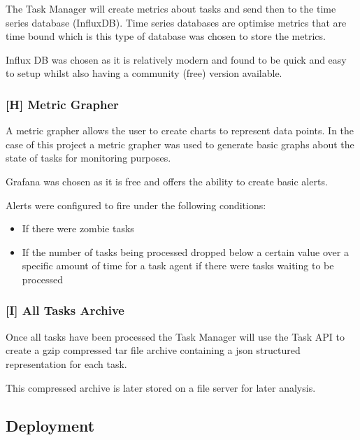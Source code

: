 \documentclass{mscreport}
\begin{document}
The Task Manager will create metrics about tasks and send then to the time series database (InfluxDB). Time series databases are optimise metrics that are time bound which is this type of database was chosen to store the metrics.

\vspace{0.3cm} \noindent
Influx DB was chosen as it is relatively modern and found to be quick and easy to setup whilst also having a community (free) version available.

\subsubsection{[H] Metric Grapher}

A metric grapher allows the user to create charts to represent data points. In the case of this project a metric grapher was used to generate basic graphs about the state of tasks for monitoring purposes.

\vspace{0.3cm} \noindent
Grafana was chosen as it is free and offers the ability to create basic alerts.

\vspace{0.3cm} \noindent
Alerts were configured to fire under the following conditions:

\begin{itemize}
	\setlength\itemsep{0.1em}
    \item If there were zombie tasks
    \item If the number of tasks being processed dropped below a certain value over a specific amount of time for a task agent if there were tasks waiting to be processed
\end{itemize}

\subsubsection{[I] All Tasks Archive}

Once all tasks have been processed the Task Manager will use the Task API to create a gzip compressed tar file archive containing a json structured representation for each task.

\vspace{0.3cm} \noindent
This compressed archive is later stored on a file server for later analysis.

\subsection{Deployment}
\end{document}
